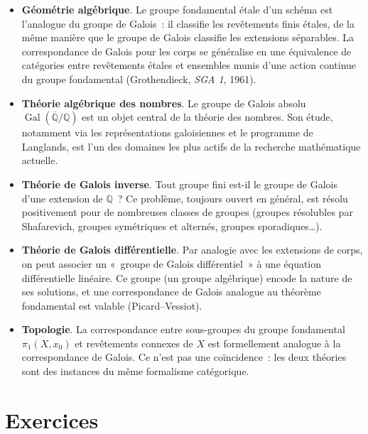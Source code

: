 \documentclass[12pt,a4paper,openany]{book}
\theoremstyle{definition}
\newcommand{\Q}{\mathbb{Q}}
\newcommand{\Gal}{\operatorname{Gal}}
\begin{document}
\begin{itemize}
  \item \textbf{Géométrie algébrique}.
    Le groupe fondamental étale d'un schéma est l'analogue du groupe de Galois~:
    il classifie les revêtements finis étales, de la même manière que le groupe
    de Galois classifie les extensions séparables. La correspondance de Galois
    pour les corps se généralise en une équivalence de catégories entre
    revêtements étales et ensembles munis d'une action continue du groupe
    fondamental (Grothendieck, \emph{SGA 1}, 1961).

  \item \textbf{Théorie algébrique des nombres}.
    Le groupe de Galois absolu $\Gal(\overline{\Q}/\Q)$ est un objet central
    de la théorie des nombres. Son étude, notamment via les représentations
    galoisiennes et le programme de Langlands, est l'un des domaines les plus
    actifs de la recherche mathématique actuelle.

  \item \textbf{Théorie de Galois inverse}.
    Tout groupe fini est-il le groupe de Galois d'une extension de $\Q$~?
    Ce problème, toujours ouvert en général, est résolu positivement pour de
    nombreuses classes de groupes (groupes résolubles par Shafarevich, groupes
    symétriques et alternés, groupes sporadiques\ldots).

  \item \textbf{Théorie de Galois différentielle}.
    Par analogie avec les extensions de corps, on peut associer un «~groupe de
    Galois différentiel~» à une équation différentielle linéaire. Ce groupe
    (un groupe algébrique) encode la nature de ses solutions, et une
    correspondance de Galois analogue au théorème fondamental est valable
    (Picard--Vessiot).

  \item \textbf{Topologie}.
    La correspondance entre sous-groupes du groupe fondamental $\pi_1(X, x_0)$
    et revêtements connexes de $X$ est formellement analogue à la
    correspondance de Galois. Ce n'est pas une coïncidence~: les deux théories
    sont des instances du même formalisme catégorique.
\end{itemize}

\section{Exercices}\label{sec:exercices-chap13}
\end{document}
